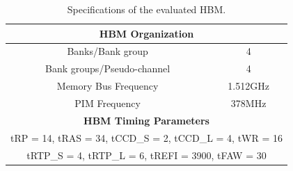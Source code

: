 \begingroup
\begin{table}[t]
  \small
  \caption{Specifications of the evaluated HBM.}
  \label{tab:specs}
  \begin{center}
    \begin{tabular}{cc}
      \toprule
      \multicolumn{2}{c}{\textbf{HBM Organization}} \\
      \midrule
      Banks/Bank group & 4 \\
      \midrule
      Bank groups/Pseudo-channel & 4 \\
      \midrule
      Memory Bus Frequency & 1.512GHz \\
      \midrule
      PIM Frequency & {378MHz} \\

      \midrule
      \multicolumn{2}{c}{\textbf{HBM Timing Parameters}} \\
      \midrule
      \multicolumn{2}{c}{tRP = 14, tRAS = 34, tCCD\_S = 2, tCCD\_L =
      4, tWR = 16} \\
      \multicolumn{2}{c}{tRTP\_S = 4, tRTP\_L = 6, tREFI = 3900, tFAW = 30} \\
      \bottomrule
    \end{tabular}
  \end{center}
\end{table}
\endgroup
